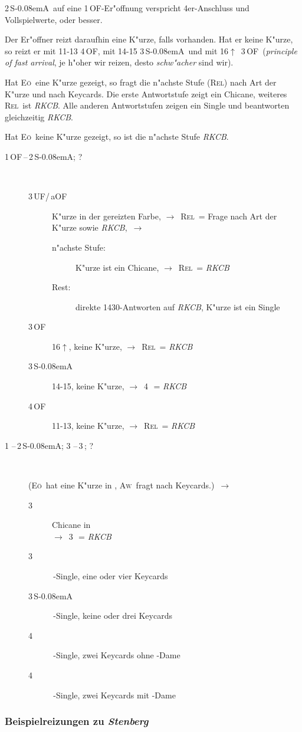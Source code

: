\documentclass[11pt,german,twocolumn]{scrartcl}
\def\pik{\nobreak\,\Sp}
\def\coe{\nobreak\,\He}
\def\kar{\nobreak\,\Di}
\def\tre{\nobreak\,\Cl}
\def\co{\He}
\def\tr{\Cl}
\def\ra{$\rightarrow$}
\def\pl{$\uparrow$}
\def\uf{\nobreak\textsf{\,UF}}
\def\of{\nobreak\textsf{\,OF}}
\def\aof{\nobreak\textsf{\,aOF}}
\def\sa{\nobreak\textsf{S\kern-0.08emA}}
\def\SA{\nobreak\,\sa}
\def\sep{\nobreak\,--\,}
\newcommand{\conv}[1]{\emph{#1}}
\def\rel{\textsc{Rel}}
\def\aw{\textsc{Aw}}
\def\eo{\textsc{E\"o}}
\def\bdsc{\begin{description}}
\def\edsc{\end{description}}
\begin{document}
2\SA\ auf eine 1\of-Er"offnung verspricht 4er-Anschluss und
Vollspielwerte, oder besser.

Der Er"offner reizt daraufhin eine K"urze, falls vorhanden. Hat er
keine K"urze, so reizt er mit 11-13 4\of, mit 14-15 3\SA\ und mit
16\pl\ 3\of\ (\conv{principle of fast arrival}, je h"oher wir reizen,
desto \emph{schw"acher} sind wir).

Hat \eo\ eine K"urze gezeigt, so fragt die n"achste Stufe (\rel) nach
Art der K"urze und nach Keycards.  Die erste Antwortstufe zeigt ein
Chicane, weiteres \rel\ ist \conv{RKCB}.  Alle anderen Antwortstufen
zeigen ein Single und beantworten gleichzeitig \conv{RKCB}.

Hat \eo\ keine K"urze gezeigt, so ist die n"achste Stufe \conv{RKCB}.

\bdsc
\item[1\of\sep2\SA; ?]~
  \bdsc
  \item[3\uf/\aof] K"urze in der gereizten Farbe, \ra~\rel\ = Frage
    nach Art der K"urze sowie \conv{RKCB},~\ra
    \bdsc
    \item[n"achste Stufe:] K"urze ist ein Chicane, \ra~\rel\ = \conv{RKCB}
    \item[Rest:] direkte 1430-Antworten auf
      \conv{RKCB}, K"urze ist ein Single
    \edsc
  \item[3\of] 16\pl, keine K"urze, \ra~\rel\ = \conv{RKCB}
  \item[3\SA] 14-15, keine K"urze, \ra~4\tre\ = \conv{RKCB}
  \item[4\of] 11-13, keine K"urze, \ra~\rel\ = \conv{RKCB}
  \edsc
\item[1\coe\sep2\SA; 3\tre\sep3\kar; ?]~

  (\eo\ hat eine K"urze in \tr, \aw\ fragt nach Keycards.)~\ra
  \bdsc
  \item[3\coe] Chicane in \tre\\
    \ra~3\pik\ = \conv{RKCB}
  \item[3\pik] \tre-Single, eine oder vier Keycards
  \item[3\SA] \tre-Single, keine oder drei Keycards
  \item[4\tre] \tre-Single, zwei Keycards ohne \co-Dame
  \item[4\kar] \tre-Single, zwei Keycards mit \co-Dame
  \edsc
\edsc

\subsubsection{Beispielreizungen zu \conv{Stenberg}}
\end{document}
